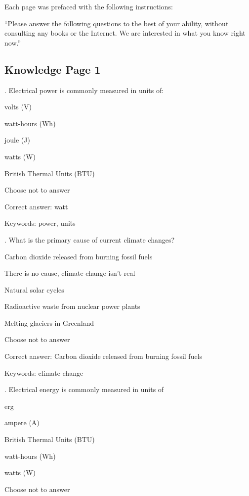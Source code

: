 Each page was prefaced with the following instructions:

``Please answer the following questions to the best of your ability, without consulting any books or the Internet. We are interested in what you know right now.''

\subsection{Knowledge Page 1}

. Electrical power is commonly measured in units of:

\begin{answer}
	\item volts (V)
	\item watt-hours (Wh)
	\item joule (J)
	\item watts (W)
	\item British Thermal Units (BTU)
	\item Choose not to answer
\end{answer}

Correct answer: watt

Keywords: power, units

\vspace{5 mm}
. What is the primary cause of current climate changes?

\begin{answer}
	\item Carbon dioxide released from burning fossil fuels
	\item There is no cause, climate change isn't real
	\item Natural solar cycles
	\item Radioactive waste from nuclear power plants
	\item Melting glaciers in Greenland
	\item Choose not to answer
\end{answer}

Correct answer: Carbon dioxide released from burning fossil fuels

Keywords: climate change

\vspace{5 mm}
. Electrical energy is commonly measured in units of

\begin{answer}
	\item erg
	\item ampere (A)
	\item British Thermal Units (BTU)
	\item watt-hours (Wh)
	\item watts (W)
	\item Choose not to answer
\end{answer}

